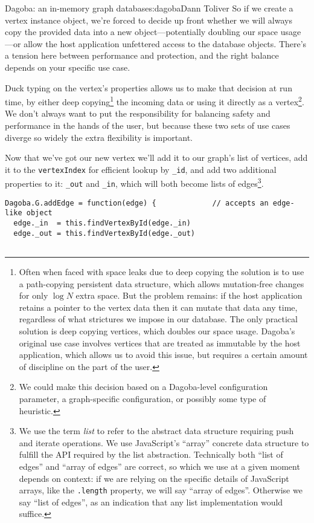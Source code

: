 \begin{aosachapter}{Dagoba: an in-memory graph database}{s:dagoba}{Dann Toliver}
So if we create a vertex instance object, we're forced to decide up
front whether we will always copy the provided data into a new
object---potentially doubling our space usage---or allow the host
application unfettered access to the database objects. There's a tension
here between performance and protection, and the right balance depends
on your specific use case.

Duck typing on the vertex's properties allows us to make that decision
at run time, by either deep copying\footnote{Often when faced with space
  leaks due to deep copying the solution is to use a path-copying
  persistent data structure, which allows mutation-free changes for only
  $\log{}N$ extra space. But the problem remains: if the host
  application retains a pointer to the vertex data then it can mutate
  that data any time, regardless of what strictures we impose in our
  database. The only practical solution is deep copying vertices, which
  doubles our space usage. Dagoba's original use case involves vertices
  that are treated as immutable by the host application, which allows us
  to avoid this issue, but requires a certain amount of discipline on
  the part of the user.} the incoming data or using it directly as a
vertex\footnote{We could make this decision based on a Dagoba-level
  configuration parameter, a graph-specific configuration, or possibly
  some type of heuristic.}. We don't always want to put the
responsibility for balancing safety and performance in the hands of the
user, but because these two sets of use cases diverge so widely the
extra flexibility is important.

Now that we've got our new vertex we'll add it to our graph's list of
vertices, add it to the \texttt{vertexIndex} for efficient lookup by
\texttt{\_id}, and add two additional properties to it: \texttt{\_out}
and \texttt{\_in}, which will both become lists of edges\footnote{We use
  the term \emph{list} to refer to the abstract data structure requiring
  push and iterate operations. We use JavaScript's ``array'' concrete
  data structure to fulfill the API required by the list abstraction.
  Technically both ``list of edges'' and ``array of edges'' are correct,
  so which we use at a given moment depends on context: if we are
  relying on the specific details of JavaScript arrays, like the
  \texttt{.length} property, we will say ``array of edges''. Otherwise
  we say ``list of edges'', as an indication that any list
  implementation would suffice.}.

\begin{verbatim}
Dagoba.G.addEdge = function(edge) {             // accepts an edge-like object
  edge._in  = this.findVertexById(edge._in)
  edge._out = this.findVertexById(edge._out)


\end{verbatim}
\end{aosachapter}
